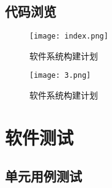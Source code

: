 \documentclass[UTF8,14pt]{article}
\numberwithin{figure}{subsubsection}
\numberwithin{table}{subsubsection}
\begin{document}
\subsection{代码浏览}
\begin{minipage}[t]{0.7\linewidth}
	\begin{figure}[H]
		\texttt{[image: index.png]}
		\caption{软件系统构建计划}
	\end{figure}
\end{minipage}
\hfill
\begin{minipage}[t]{0.28\linewidth}
	\begin{figure}[H]
		\centering
		\texttt{[image: 3.png]}
		\caption{软件系统构建计划}
	\end{figure}
\end{minipage}

\section{软件测试}
\subsection{单元用例测试}
\end{document}
